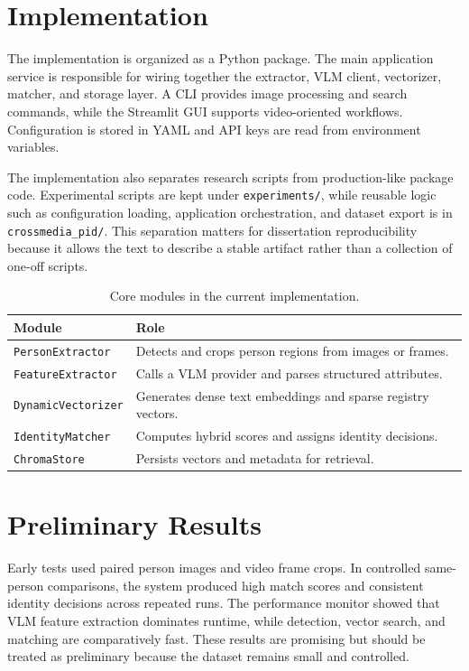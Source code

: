 \section{Implementation}

The implementation is organized as a Python package. The main application service is responsible for wiring together the extractor, VLM client, vectorizer, matcher, and storage layer. A CLI provides image processing and search commands, while the Streamlit GUI supports video-oriented workflows. Configuration is stored in YAML and API keys are read from environment variables.

The implementation also separates research scripts from production-like package code. Experimental scripts are kept under \texttt{experiments/}, while reusable logic such as configuration loading, application orchestration, and dataset export is in \texttt{crossmedia\_pid/}. This separation matters for dissertation reproducibility because it allows the text to describe a stable artifact rather than a collection of one-off scripts.

\begin{table}[htbp]
  \centering
  \caption{Core modules in the current implementation.}
  \label{tab:paper1-modules}
  \begin{tabularx}{\textwidth}{lX}
    \toprule
    Module & Role \\
    \midrule
    \texttt{PersonExtractor} & Detects and crops person regions from images or frames. \\
    \texttt{FeatureExtractor} & Calls a VLM provider and parses structured attributes. \\
    \texttt{DynamicVectorizer} & Generates dense text embeddings and sparse registry vectors. \\
    \texttt{IdentityMatcher} & Computes hybrid scores and assigns identity decisions. \\
    \texttt{ChromaStore} & Persists vectors and metadata for retrieval. \\
    \bottomrule
  \end{tabularx}
\end{table}

\section{Preliminary Results}

Early tests used paired person images and video frame crops. In controlled same-person comparisons, the system produced high match scores and consistent identity decisions across repeated runs. The performance monitor showed that VLM feature extraction dominates runtime, while detection, vector search, and matching are comparatively fast. These results are promising but should be treated as preliminary because the dataset remains small and controlled.

